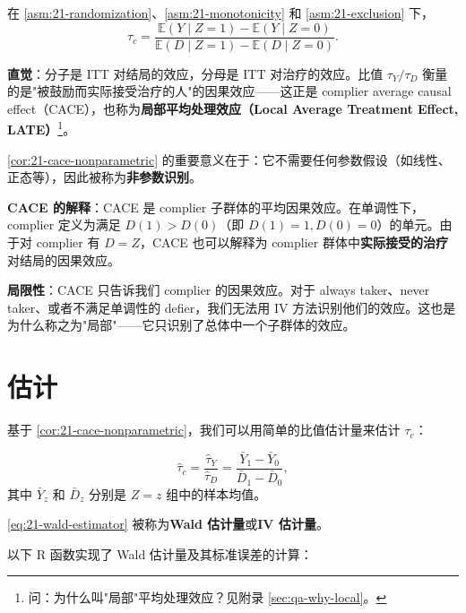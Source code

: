 \begin{Corollary}\label{cor:21-cace-nonparametric}
在 \cref{asm:21-randomization}、\cref{asm:21-monotonicity} 和 \cref{asm:21-exclusion} 下，
\begin{equation}
\tau_c = \frac{\mathbb{E}(Y \mid Z = 1) - \mathbb{E}(Y \mid Z = 0)}{\mathbb{E}(D \mid Z = 1) - \mathbb{E}(D \mid Z = 0)}.
\label{eq:21-cace-identification-formula}
\end{equation}
\end{Corollary}

\textbf{直觉}：分子是 ITT 对结局的效应，分母是 ITT 对治疗的效应。比值 $\tau_Y / \tau_D$ 衡量的是"被鼓励而实际接受治疗的人"的因果效应——这正是 complier average causal effect（CACE），也称为\textbf{局部平均处理效应（Local Average Treatment Effect, LATE）}\footnote{问：为什么叫"局部"平均处理效应？见附录 \cref{sec:qa-why-local}。}。

\cref{cor:21-cace-nonparametric} 的重要意义在于：它不需要任何参数假设（如线性、正态等），因此被称为\textbf{非参数识别}。

\textbf{CACE 的解释}：CACE 是 complier 子群体的平均因果效应。在单调性下，complier 定义为满足 $D(1) > D(0)$（即 $D(1) = 1, D(0) = 0$）的单元。由于对 complier 有 $D = Z$，CACE 也可以解释为 complier 群体中\textbf{实际接受的治疗}对结局的因果效应。

\textbf{局限性}：CACE 只告诉我们 complier 的因果效应。对于 always taker、never taker、或者不满足单调性的 defier，我们无法用 IV 方法识别他们的效应。这也是为什么称之为"局部"——它只识别了总体中一个子群体的效应。

\section{估计}
\label{sec:21-estimation}

基于 \cref{cor:21-cace-nonparametric}，我们可以用简单的比值估计量来估计 $\tau_c$：

\begin{equation}
\hat{\tau}_c = \frac{\hat{\tau}_Y}{\hat{\tau}_D} = \frac{\bar{Y}_1 - \bar{Y}_0}{\bar{D}_1 - \bar{D}_0},
\label{eq:21-wald-estimator}
\end{equation}
其中 $\bar{Y}_z$ 和 $\bar{D}_z$ 分别是 $Z=z$ 组中的样本均值。

\cref{eq:21-wald-estimator} 被称为\textbf{Wald 估计量}或\textbf{IV 估计量}。

以下 R 函数实现了 Wald 估计量及其标准误差的计算：

